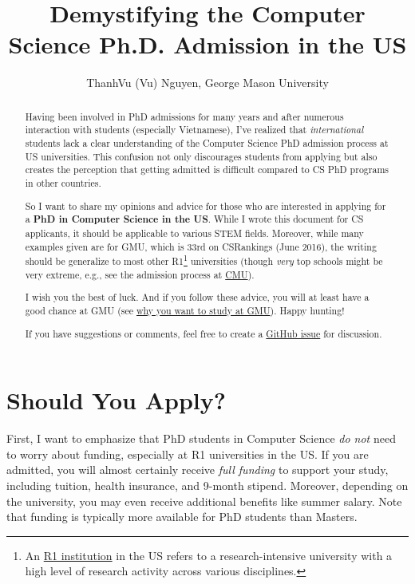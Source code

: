 \documentclass[10pt]{article}
\title{Demystifying the Computer Science Ph.D. Admission in the US}
\date{}
\author{ThanhVu (Vu) Nguyen, George Mason University}
\begin{document}
\maketitle

\begin{abstract}
Having been involved in PhD admissions for many years and after
numerous interaction with  students (especially Vietnamese), I've
realized that \emph{international} students lack a clear understanding of
the Computer Science PhD admission process at US universities. This confusion not only
discourages students from applying but also creates the perception that
getting admitted is difficult compared to CS PhD programs in other countries.

So I want to share my opinions and advice for those who are interested in applying for a \textbf{PhD in Computer Science in the US}.
While I wrote this document for CS applicants, it should be applicable to various STEM fields.
Moreover, while many examples given are for GMU, which is 33rd on CSRankings (June 2016), the writing should be generalize to most other R1\footnote{An \href{https://en.wikipedia.org/wiki/List_of_research_universities_in_the_United_States}{R1 institution} in the US refers to a research-intensive university with a high level of research activity across various disciplines.} universities  (though \emph{very} top schools might be very extreme, e.g., see the admission process at \href{https://da-data.blogspot.com/2015/03/reflecting-on-cs-graduate-admissions.html}{CMU}).

I wish you the best of luck. And if you follow these advice,
you will at least have a good chance at GMU (see
\href{https://github.com/dynaroars/dynaroars.github.io/wiki/About-GMU}{why
you want to study at GMU}). Happy hunting!

If you have suggestions or comments, feel free to create a \href{https://github.com/nguyenthanhvuh/phd-cs-us/issues}{GitHub issue} for discussion.
\end{abstract}

\section{Should You Apply?}


First, I want to emphasize that PhD students in Computer
Science \emph{do not} need to worry about funding, especially at R1
universities in the US. If you are admitted, you will almost certainly
receive \emph{full funding} to support your study, including tuition,
health insurance, and 9-month stipend. Moreover, depending on the university,
you may even receive additional benefits like summer salary. Note that
funding is typically more available for PhD students than 
Masters. %
\end{document}
